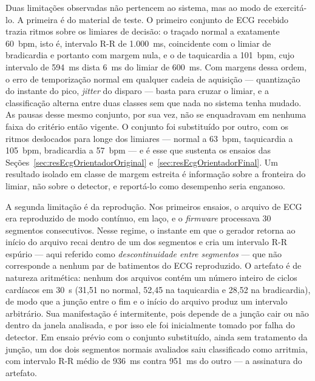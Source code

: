 Duas limitações observadas não pertencem ao sistema, mas ao modo de exercitá-lo. A primeira
é do material de teste. O primeiro conjunto de \acs{ECG} recebido trazia ritmos sobre os
limiares de decisão: o traçado normal a exatamente 60~bpm, isto é, intervalo R-R de 1.000~ms,
coincidente com o limiar de bradicardia e portanto com margem nula, e o de taquicardia a
101~bpm, cujo intervalo de 594~ms dista 6~ms do limiar de 600~ms. Com margens dessa ordem, o
erro de temporização normal em qualquer cadeia de aquisição --- quantização do instante do
pico, \textit{jitter} do disparo --- basta para cruzar o limiar, e a classificação alterna
entre duas classes sem que nada no sistema tenha mudado. As pausas desse mesmo conjunto, por
sua vez, não se enquadravam em nenhuma faixa do critério então vigente. O conjunto foi
substituído por outro, com os ritmos deslocados para longe dos limiares --- normal a 63~bpm,
taquicardia a 105~bpm, bradicardia a 57~bpm --- e é esse que sustenta os ensaios das
Seções~\ref{sec:resEcgOrientadorOriginal} e~\ref{sec:resEcgOrientadorFinal}. Um resultado
isolado em classe de margem estreita é informação sobre a fronteira do limiar, não sobre o
detector, e reportá-lo como desempenho seria enganoso.

A segunda limitação é da reprodução. Nos primeiros ensaios, o arquivo de \acs{ECG} era
reproduzido de modo contínuo, em laço, e o \textit{firmware} processava 30 segmentos
consecutivos. Nesse regime, o instante em que o gerador retorna ao início do arquivo recai
dentro de um dos segmentos e cria um intervalo R-R espúrio --- aqui referido como
\emph{descontinuidade entre segmentos} --- que não corresponde a nenhum par de batimentos do
\acs{ECG} reproduzido. O artefato é de natureza aritmética: nenhum dos arquivos contém um
número inteiro de ciclos cardíacos em 30~s (31,51 no normal, 52,45 na taquicardia e 28,52 na
bradicardia), de modo que a junção entre o fim e o início do arquivo produz um intervalo
arbitrário. Sua manifestação é intermitente, pois depende de a junção cair ou não dentro da
janela analisada, e por isso ele foi inicialmente tomado por falha do detector. Em ensaio
prévio com o conjunto substituído, ainda sem tratamento da junção, um dos dois segmentos
normais avaliados saiu classificado como arritmia, com intervalo R-R médio de 936~ms contra
951~ms do outro --- a assinatura do artefato.


